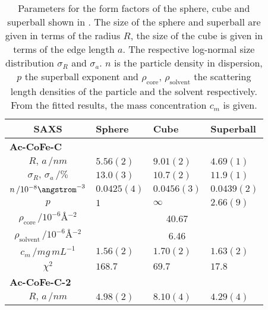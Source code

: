 \documentclass[\main/dresen_thesis.tex]{subfiles}
\begin{document}
    \begin{table}[ht]
      \centering
      \caption{\label{tab:monolayers:nanoparticle:saxs:shapeModelStudy}Parameters for the form factors of the sphere, cube and superball shown in . 
      The size of the sphere and superball are given in terms of the radius $R$, the size of the cube is given in terms of the edge length $a$.
      The respective log-normal size distribution $\sigma_R$ and $\sigma_a$. $n$ is the particle density in dispersion, $p$ the superball exponent and $\rho_\mathrm{core}$, $\rho_\mathrm{solvent}$ the scattering length densities of the particle and the solvent respectively. From the fitted results, the mass concentration $c_m$ is given.}
      \begin{tabular}{ c | l | l | l }
        \textbf{SAXS}  & \textbf{Sphere} & \textbf{Cube} & \textbf{Superball}\\
        \hline
          \multicolumn{4}{l}{\textbf{Ac-CoFe-C}}\\
        \hline
        \rule{0pt}{2ex} $R, \, a \, / \unit{nm}$                      & $5.56(2)$      & $9.01(2)$  & $4.69(1)$\\
        \rule{0pt}{2ex} $\sigma_R, \, \sigma_a \, / \unit{\%}$        & $13.0(3)$      & $10.7(2)$  & $11.9(1)$\\
        \rule{0pt}{2ex} $n \, / 10^{-8} \angstrom^{-3}$               & $0.0425(4)$    & $0.0456(3)$& $0.0439(2)$\\
        \rule{0pt}{2ex} $p$                                           & $1$            & $\infty$   & $2.66(9)$\\
        \hline
        \rule{0pt}{2ex} $\rho_\mathrm{core}    \, / \unit{10^{-6} \angstrom^{-2}}$     & \multicolumn{3}{c}{40.67}\\
        \rule{0pt}{2ex} $\rho_\mathrm{solvent} \, / \unit{10^{-6} \angstrom^{-2}}$     & \multicolumn{3}{c}{6.46}\\
        \hline
        \rule{0pt}{2ex} $c_m \, / \unit{mg\, mL^{-1}}$                & $1.56(2)$      & $1.70(2)$  & $1.63(2)$\\
        \hline
        \rule{0pt}{2ex} $\chi^2$                                      & $168.7$        & $69.7$     & $17.8$\\
        \hline
        \hline
        \multicolumn{4}{l}{\textbf{Ac-CoFe-C-2}}\\
        \hline
        \rule{0pt}{2ex} $R, \, a \, / \unit{nm}$                      & $4.98(2)$      & $8.10(4)$  & $4.29(4)$\\

\end{tabular}
\end{table}
\end{document}
